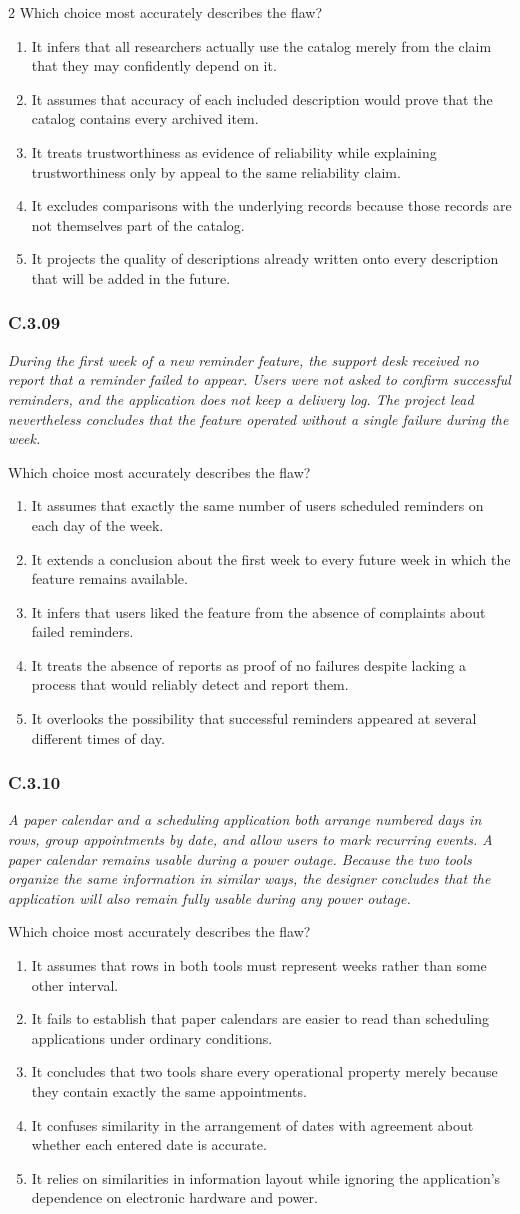 \documentclass[10pt]{extarticle}
\newcommand{\choice}[1]{\item #1}
\newcommand{\bankitem}[1]{\subsubsection*{#1}}
\begin{document}
\begin{multicols}{2}
Which choice most accurately describes the flaw?
\begin{enumerate}[label=(\alph*)]
  \choice{It infers that all researchers actually use the catalog merely from the claim that they may confidently depend on it.}
  \choice{It assumes that accuracy of each included description would prove that the catalog contains every archived item.}
  \choice{It treats trustworthiness as evidence of reliability while explaining trustworthiness only by appeal to the same reliability claim.}
  \choice{It excludes comparisons with the underlying records because those records are not themselves part of the catalog.}
  \choice{It projects the quality of descriptions already written onto every description that will be added in the future.}
\end{enumerate}
\bankitem{C.3.09}
\emph{During the first week of a new reminder feature, the support desk received no report that a reminder failed to appear. Users were not asked to confirm successful reminders, and the application does not keep a delivery log. The project lead nevertheless concludes that the feature operated without a single failure during the week.}

Which choice most accurately describes the flaw?
\begin{enumerate}[label=(\alph*)]
  \choice{It assumes that exactly the same number of users scheduled reminders on each day of the week.}
  \choice{It extends a conclusion about the first week to every future week in which the feature remains available.}
  \choice{It infers that users liked the feature from the absence of complaints about failed reminders.}
  \choice{It treats the absence of reports as proof of no failures despite lacking a process that would reliably detect and report them.}
  \choice{It overlooks the possibility that successful reminders appeared at several different times of day.}
\end{enumerate}
\bankitem{C.3.10}
\emph{A paper calendar and a scheduling application both arrange numbered days in rows, group appointments by date, and allow users to mark recurring events. A paper calendar remains usable during a power outage. Because the two tools organize the same information in similar ways, the designer concludes that the application will also remain fully usable during any power outage.}

Which choice most accurately describes the flaw?
\begin{enumerate}[label=(\alph*)]
  \choice{It assumes that rows in both tools must represent weeks rather than some other interval.}
  \choice{It fails to establish that paper calendars are easier to read than scheduling applications under ordinary conditions.}
  \choice{It concludes that two tools share every operational property merely because they contain exactly the same appointments.}
  \choice{It confuses similarity in the arrangement of dates with agreement about whether each entered date is accurate.}
  \choice{It relies on similarities in information layout while ignoring the application's dependence on electronic hardware and power.}
\end{enumerate}

\end{multicols}
\end{document}
